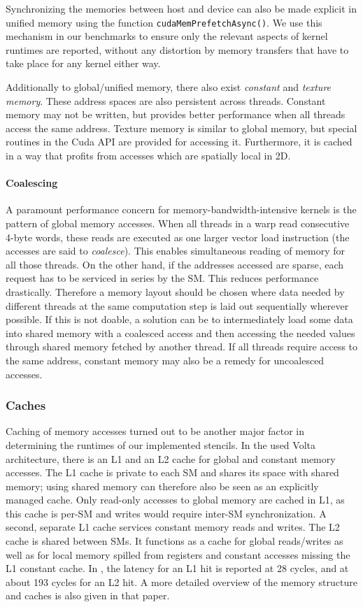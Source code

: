 Synchronizing the memories between host and device can also be made explicit in unified memory using the function \texttt{cudaMemPrefetchAsync()}. We use this mechanism in our benchmarks to ensure only the relevant aspects of kernel runtimes are reported, without any distortion by memory transfers that have to take place for any kernel either way.

Additionally to global/unified memory, there also exist \emph{constant} and \emph{texture memory}. These address spaces are also persistent across threads. Constant memory may not be written, but provides better performance when all threads access the same address. Texture memory is similar to global memory, but special routines in the Cuda API are provided for accessing it. Furthermore, it is cached in a way that profits from accesses which are spatially local in 2D.

\paragraph{Coalescing} A paramount performance concern for memory-bandwidth-intensive kernels is the pattern of global memory accesses. When all threads in a warp read consecutive 4-byte words, these reads are executed as one larger vector load instruction (the accesses are said to \emph{coalesce}). This enables simultaneous reading of memory for all those threads. On the other hand, if the addresses accessed are sparse, each request has to be serviced in series by the SM. This reduces performance drastically. Therefore a memory layout should be chosen where data needed by different threads at the same computation step is laid out sequentially wherever possible. If this is not doable, a solution can be to intermediately load some data into shared memory with a coalesced access and then accessing the needed values through shared memory fetched by another thread. If all threads require access to the same address, constant memory may also be a remedy for uncoalesced accesses.

\subsubsection{Caches} Caching of memory accesses turned out to be another major factor in determining the runtimes of our implemented stencils. In the used Volta architecture, there is an L1 and an L2 cache for global and constant memory accesses. The L1 cache is private to each SM and shares its space with shared memory; using shared memory can therefore also be seen as an explicitly managed cache. Only read-only accesses to global memory are cached in L1, as this cache is per-SM and writes would require inter-SM synchronization. A second, separate L1 cache services constant memory reads and writes. The L2 cache is shared between SMs. It functions as a cache for global reads/writes as well as for local memory spilled from registers and constant accesses missing the L1 constant cache. In \cite[Chapter 3]{dissecting}, the latency for an L1 hit is reported at 28 cycles, and at about 193 cycles for an L2 hit. A more detailed overview of the memory structure and caches is also given in that paper.

